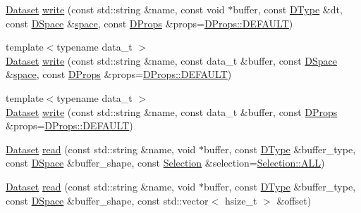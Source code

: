 \begin{DoxyCompactItemize}
\hyperlink{class_h5_t_l_1_1_dataset}{Dataset} \hyperlink{class_h5_t_l_1_1_group_a90c193fd37dd7f35b9b62f05f830b084}{write} (const std\-::string \&name, const void $\ast$buffer, const \hyperlink{class_h5_t_l_1_1_d_type}{D\-Type} \&dt, const \hyperlink{class_h5_t_l_1_1_d_space}{D\-Space} \&\hyperlink{namespace_h5_t_l_ae09d3a5b75f86dad261e807592fee081}{space}, const \hyperlink{class_h5_t_l_1_1_d_props}{D\-Props} \&props=\hyperlink{class_h5_t_l_1_1_d_props_a92db9269544c73f48d72be1db4256107}{D\-Props\-::\-D\-E\-F\-A\-U\-L\-T})
\item 
{\footnotesize template$<$typename data\-\_\-t $>$ }\\\hyperlink{class_h5_t_l_1_1_dataset}{Dataset} \hyperlink{class_h5_t_l_1_1_group_aa7ec7b8867f7e0bcf2fb1ee7de321119}{write} (const std\-::string \&name, const data\-\_\-t \&buffer, const \hyperlink{class_h5_t_l_1_1_d_space}{D\-Space} \&\hyperlink{namespace_h5_t_l_ae09d3a5b75f86dad261e807592fee081}{space}, const \hyperlink{class_h5_t_l_1_1_d_props}{D\-Props} \&props=\hyperlink{class_h5_t_l_1_1_d_props_a92db9269544c73f48d72be1db4256107}{D\-Props\-::\-D\-E\-F\-A\-U\-L\-T})
\item 
{\footnotesize template$<$typename data\-\_\-t $>$ }\\\hyperlink{class_h5_t_l_1_1_dataset}{Dataset} \hyperlink{class_h5_t_l_1_1_group_a1acf181964e091a05491bdd07dc2acf2}{write} (const std\-::string \&name, const data\-\_\-t \&buffer, const \hyperlink{class_h5_t_l_1_1_d_props}{D\-Props} \&props=\hyperlink{class_h5_t_l_1_1_d_props_a92db9269544c73f48d72be1db4256107}{D\-Props\-::\-D\-E\-F\-A\-U\-L\-T})
\item 
\hyperlink{class_h5_t_l_1_1_dataset}{Dataset} \hyperlink{class_h5_t_l_1_1_group_ab726c68a6db6a1055085e59dfb87621f}{read} (const std\-::string \&name, void $\ast$buffer, const \hyperlink{class_h5_t_l_1_1_d_type}{D\-Type} \&buffer\-\_\-type, const \hyperlink{class_h5_t_l_1_1_d_space}{D\-Space} \&buffer\-\_\-shape, const \hyperlink{class_h5_t_l_1_1_selection}{Selection} \&selection=\hyperlink{class_h5_t_l_1_1_selection_a32d830ebff3c607e0425fa5d6ef72df0}{Selection\-::\-A\-L\-L})
\item 
\hyperlink{class_h5_t_l_1_1_dataset}{Dataset} \hyperlink{class_h5_t_l_1_1_group_a35a7440b9f212a8498da095fffa6df6d}{read} (const std\-::string \&name, void $\ast$buffer, const \hyperlink{class_h5_t_l_1_1_d_type}{D\-Type} \&buffer\-\_\-type, const \hyperlink{class_h5_t_l_1_1_d_space}{D\-Space} \&buffer\-\_\-shape, const std\-::vector$<$ hsize\-\_\-t $>$ \&offset)
\item 

\end{DoxyCompactItemize}
